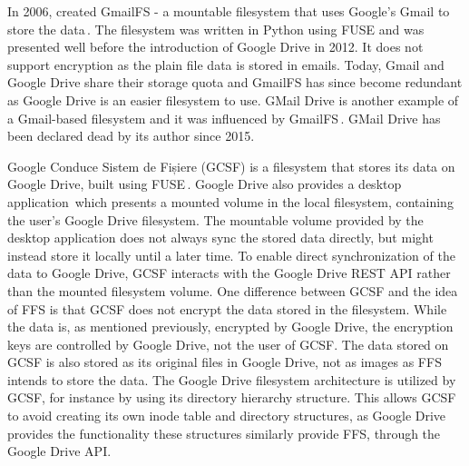 In 2006, \citeauthor{jonesGoogleHackUse2006} created GmailFS - a mountable filesystem that uses Google's Gmail to store the data\,\cite{jonesGoogleHackUse2006, jonesGmailFilesystemImplementation2006}. The filesystem was written in Python using FUSE and was presented well before the introduction of Google Drive in 2012. It does not support encryption as the plain file data is stored in emails. Today, Gmail and Google Drive share their storage quota and GmailFS has since become redundant as Google Drive is an easier filesystem to use. GMail Drive is another example of a Gmail-based filesystem and it was influenced by GmailFS\,\cite{viksoeViksoeDkGMail2004}. GMail Drive has been declared dead by its author since 2015.

Google Conduce Sistem de Fișiere (GCSF) is a filesystem that stores its data on Google Drive, built using FUSE\,\cite{puscassergiudanGCSFVIRTUALFILE2018,puscasHarababurelGcsf2022}. Google Drive also provides a desktop application\,\cite{googleInstallSetGoogle} which presents a mounted volume in the local filesystem, containing the user's Google Drive filesystem. The mountable volume provided by the desktop application does not always sync the stored data directly, but might instead store it locally until a later time. To enable direct synchronization of the data to Google Drive, GCSF interacts with the Google Drive REST API rather than the mounted filesystem volume. One difference between GCSF and the idea of FFS is that GCSF does not encrypt the data stored in the filesystem. While the data is, as mentioned previously, encrypted by Google Drive, the encryption keys are controlled by Google Drive, not the user of GCSF. The data stored on GCSF is also stored as its original files in Google Drive, not as images as FFS intends to store the data. The Google Drive filesystem architecture is utilized by GCSF, for instance by using its directory hierarchy structure. This allows GCSF to avoid creating its own inode table and directory structures, as Google Drive provides the functionality these structures similarly provide FFS, through the Google Drive API.

